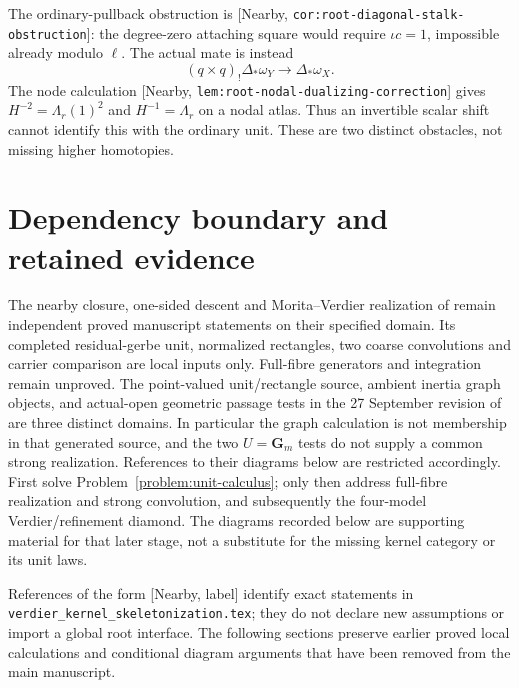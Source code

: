 \documentclass[11pt]{article}
\theoremstyle{definition}
\theoremstyle{remark}
\newcommand{\mainref}[1]{\textnormal{[Nearby, \nolinkurl{#1}]}}
\begin{document}
The ordinary-pullback obstruction is \mainref{cor:root-diagonal-stalk-obstruction}:
the degree-zero attaching square would require $\iota c=1$, impossible
already modulo $\ell$.  The actual mate is instead
\[
 (q\times q)_!\Delta_*\omega_Y\longrightarrow\Delta_*\omega_X.
\]
The node calculation \mainref{lem:root-nodal-dualizing-correction}
gives $H^{-2}=\Lambda_r(1)^2$ and $H^{-1}=\Lambda_r$ on a nodal atlas.
Thus an invertible scalar shift cannot identify this with the ordinary
unit.  These are two distinct obstacles, not missing higher homotopies.

\section{Dependency boundary and retained evidence}
The nearby closure, one-sided descent and Morita--Verdier realization
of \cite{Nearby} remain independent proved manuscript statements on
their specified domain.  Its completed residual-gerbe unit, normalized
rectangles, two coarse convolutions and carrier comparison are local
inputs only.  Full-fibre generators and integration remain unproved.
The point-valued unit/rectangle source, ambient inertia graph objects,
and actual-open geometric passage tests in the 27 September revision
of \cite{Nearby} are three distinct domains.  In particular the graph
calculation is not membership in that generated source, and the two
$U=\mathbf G_m$ tests do not supply a common strong realization.
References to their diagrams below are restricted accordingly.
First solve Problem~\ref{problem:unit-calculus}; only then address
full-fibre realization and strong convolution, and subsequently the
four-model Verdier/refinement diamond.  The diagrams recorded below
are supporting material for that later stage, not a substitute for
the missing kernel category or its unit laws.

References of the form [Nearby, label] identify exact statements in
\nolinkurl{verdier_kernel_skeletonization.tex}; they do not declare new
assumptions or import a global root interface.  The following sections
preserve earlier proved local calculations and conditional diagram
arguments that have been removed from the main manuscript.
\end{document}
